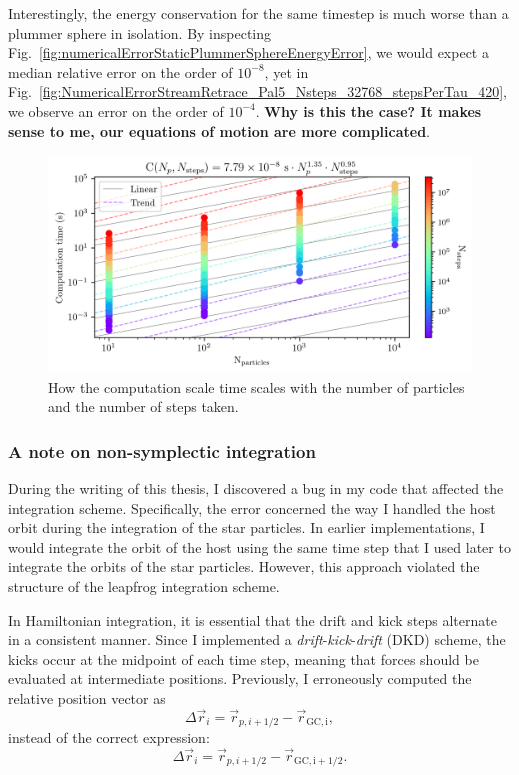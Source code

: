         Interestingly, the energy conservation for the same timestep is much worse than a plummer sphere in isolation. By inspecting Fig.~\ref{fig:numericalErrorStaticPlummerSphereEnergyError}, we would expect a median relative error on the order of $10^{-8}$, yet in Fig.~\ref{fig:NumericalErrorStreamRetrace_Pal5_Nsteps_32768_stepsPerTau_420}, we observe an error on the order of $10^{-4}$. \textbf{Why is this the case? It makes sense to me, our equations of motion are more complicated}.


        \begin{figure}
            \centering
            \includegraphics[width=\linewidth]{images/NumericalErrorComputationTimeScalingForStreams.png}
            \caption{How the computation scale time scales with the number of particles and the number of steps taken.}
            \label{fig:NumericalErrorComputationTimeScalingForStreams}
        \end{figure}



        \subsubsection{A note on non-symplectic integration}

        During the writing of this thesis, I discovered a bug in my code that affected the integration scheme. Specifically, the error concerned the way I handled the host orbit during the integration of the star particles. In earlier implementations, I would integrate the orbit of the host using the same time step that I used later to integrate the orbits of the star particles. However, this approach violated the structure of the leapfrog integration scheme.

        In Hamiltonian integration, it is essential that the drift and kick steps alternate in a consistent manner. Since I implemented a \textit{drift}-\textit{kick}-\textit{drift} (DKD) scheme, the kicks occur at the midpoint of each time step, meaning that forces should be evaluated at intermediate positions. Previously, I erroneously computed the relative position vector as
        \[
        \Delta \vec{r}_i = \vec{r}_{p,i+1/2} - \vec{r}_\mathrm{GC,i},
        \]
        instead of the correct expression:
        \[
        \Delta \vec{r}_i = \vec{r}_{p,i+1/2} - \vec{r}_\mathrm{GC,i+1/2}.
        \]

